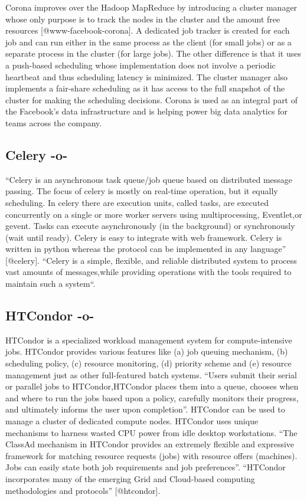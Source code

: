 Corona improves over the Hadoop MapReduce by introducing a cluster
manager whose only purpose is to track the nodes in the cluster and
the amount free resources [@www-facebook-corona]. A dedicated job
tracker is created for each job and can run either in the same process
as the client (for small jobs) or as a separate process in the cluster
(for large jobs). The other difference is that it uses a push-based
scheduling whose implementation does not involve a periodic heartbeat
and thus scheduling latency is minimized. The cluster manager also
implements a fair-share scheduling as it has access to the full
snapshot of the cluster for making the scheduling decisions. Corona is
used as an integral part of the Facebook's data infrastructure and is
helping power big data analytics for teams across the company.
     
\subsection{Celery -o-}

``Celery is an asynchronous task queue/job queue based on distributed
message passing.  The focus of celery is mostly on real-time
operation, but it equally scheduling.  In celery there are execution
units, called tasks, are executed concurrently on a single or more
worker servers using multiprocessing, Eventlet,or gevent.  Tasks can
execute asynchronously (in the background) or synchronously (wait
until ready).  Celery is easy to integrate with web framework. Celery
is written in python whereas the protocol can be implemented in any
language'' [@celery]. ``Celery is a simple, flexible, and reliable
distributed system to process vast amounts of messages,while providing
operations with the tools required to maintain such a
system``\cite{celerydocs}.



     
\subsection{HTCondor -o-}

    
HTCondor is a specialized workload management system for
compute-intensive jobs.  HTCondor provides various features like (a) job
queuing mechanism, (b) scheduling policy, (c) resource monitoring,
(d) priority scheme and (e) resource management just as other
full-featured batch systems.  ``Users submit their serial or parallel
jobs to HTCondor,HTCondor places them into a queue, chooses when and
where to run the jobs based upon a policy, carefully monitors their
progress, and ultimately informs the user upon completion''.  HTCondor
can be used to manage a cluster of dedicated compute nodes. HTCondor
uses unique mechanisms to harness wasted CPU power from idle desktop
workstations. ``The ClassAd mechanism in HTCondor provides an
extremely flexible and expressive framework for matching resource
requests (jobs) with resource offers (machines).  Jobs can easily
state both job requirements and job preferences''.  ``HTCondor
incorporates many of the emerging Grid and Cloud-based computing
methodologies and protocols'' [@htcondor].



